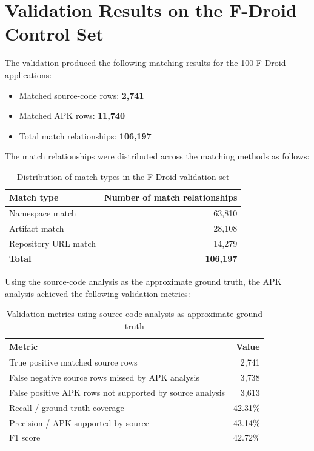 \documentclass[12pt,a4paper]{report}
\begin{document}
\section{Validation Results on the F-Droid Control Set}
The validation produced the following matching results for the 100 F-Droid applications:

\begin{itemize}
\item Matched source-code rows: \textbf{2,741}
\item Matched APK rows: \textbf{11,740}
\item Total match relationships: \textbf{106,197}
\end{itemize}

The match relationships were distributed across the matching methods as follows:

\begin{table}[htbp]
\centering
\caption{Distribution of match types in the F-Droid validation set}
\label{tab:fdroid-validation-match-types}
\begin{tabular}{lr}
\hline
\textbf{Match type} & \textbf{Number of match relationships} \\
\hline
Namespace match & 63,810 \\
Artifact match & 28,108 \\
Repository URL match & 14,279 \\
\hline
\textbf{Total} & \textbf{106,197} \\
\hline
\end{tabular}
\end{table}

Using the source-code analysis as the approximate ground truth, the APK analysis achieved the following validation metrics:

\begin{table}[htbp]
\centering
\caption{Validation metrics using source-code analysis as approximate ground truth}
\label{tab:fdroid-validation-accuracy}
\begin{tabular}{lr}
\hline
\textbf{Metric} & \textbf{Value} \\
\hline
True positive matched source rows & 2,741 \\
False negative source rows missed by APK analysis & 3,738 \\
False positive APK rows not supported by source analysis & 3,613 \\
Recall / ground-truth coverage & 42.31\% \\
Precision / APK supported by source & 43.14\% \\
F1 score & 42.72\% \\
\hline
\end{tabular}
\end{table}
\end{document}
